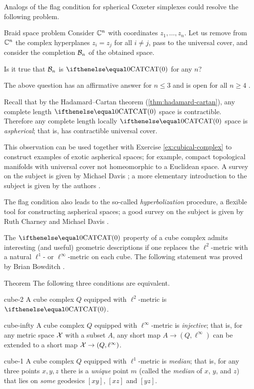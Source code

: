 Analogs of the flag condition for spherical Coxeter simplexes
could resolve the following problem. 

\begin{thm}{Braid space problem}
Consider $\mathbb{C}^n$ with coordinates $z_1,\dots,z_n$.
Let us remove from $\mathbb{C}^n$ the complex hyperplanes $z_i=z_j$ for all $i\ne j$,
pass to the universal cover, and consider the completion $\mathcal{B}_n$ 
of the obtained space.

Is it true that $\mathcal{B}_n$ is $\CAT0$ for any $n$?
\end{thm}

The above question has an affirmative answer for $n\le 3$ and is open for all $n\ge 4$ \cite{charney-davis-1993,panov-petrunin}.

Recall that by the Hadamard--Cartan theorem (\ref{thm:hadamard-cartan}), 
any complete length $\CAT{0}$ space is contractible.
Therefore any complete length locally $\CAT{0}$ space 
is \emph{aspherical};
that is, has contractible universal cover.

This observation can be used together with Exercise \ref{ex:cubical-complex} to construct examples of exotic aspherical spaces;
for example, compact topological manifolds with universal cover not homeomorphic to a Euclidean space.
A survey on the subject is given by Michael Davis \cite{davis-2001}; a more elementary introduction to the subject is given by the authors \cite[Chapter 3]{alexander-kapovitch-petrunin-CAT}.

The flag condition also leads to the so-called {}\emph{hyperbolization} procedure, a flexible tool for constructing  aspherical spaces;
a good survey on the subject is given by Ruth Charney and Michael Davis \cite{charney-davis-1995}.

The $\CAT0$ property of a cube complex admits interesting (and useful) geometric descriptions if one replaces the $\ell^2$-metric with a natural $\ell^1$- or $\ell^\infty$-metric on each cube.
The following statement was proved by Brian Bowditch \cite{bowditch-2020}.

\begin{thm}{Theorem}
The following three conditions are equivalent.

\begin{subthm}{cube-2} A cube complex $Q$ equipped with  $\ell^2$-metric is $\CAT0$.
\end{subthm}

\begin{subthm}{cube-infty} A cube complex $Q$ equipped with $\ell^\infty$-metric is \emph{injective}; that is, for any metric space $\mathcal{X}$ with a subset $A$, any short map $A\to (Q,\ell^\infty)$ can be extended to a short map $\spc{X}\to (Q,\ell^\infty)$.
\end{subthm}

\begin{subthm}{cube-1} A cube complex $Q$ equipped with $\ell^1$-metric is \emph{median}; that is, for any three points $x,y,z$ there is a {}\emph{unique} point   $m$ (called the  \emph{median} of $x$, $y$, and $z$) that lies on {}\emph{some} geodesics $[xy]$, $[xz]$ and $[yz]$.
\end{subthm}
\end{thm}
